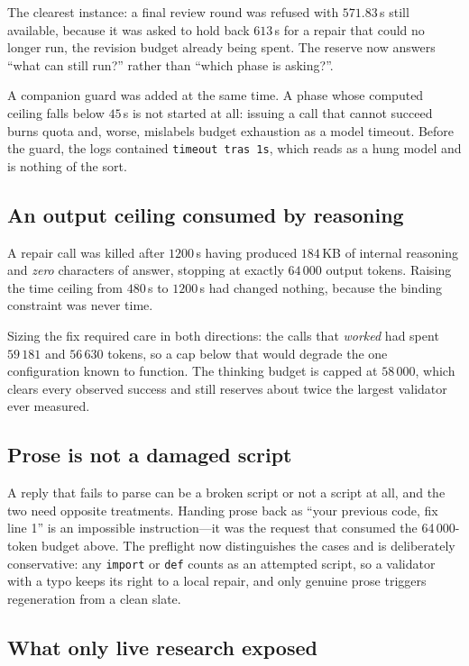 \documentclass[11pt,a4paper]{article}
\newcommand{\code}[1]{\texttt{\small #1}}
\begin{document}
The clearest instance: a final review round was refused with $571.83$\,s still
available, because it was asked to hold back $613$\,s for a repair that could no
longer run, the revision budget already being spent. The reserve now answers
``what can still run?'' rather than ``which phase is asking?''.

A companion guard was added at the same time. A phase whose computed ceiling
falls below $45$\,s is not started at all: issuing a call that cannot succeed
burns quota and, worse, mislabels budget exhaustion as a model timeout. Before
the guard, the logs contained \code{timeout tras 1s}, which reads as a hung
model and is nothing of the sort.

\subsection{An output ceiling consumed by reasoning}

A repair call was killed after $1200$\,s having produced $184$\,KB of internal
reasoning and \emph{zero} characters of answer, stopping at exactly $64\,000$
output tokens. Raising the time ceiling from $480$\,s to $1200$\,s had changed
nothing, because the binding constraint was never time.

Sizing the fix required care in both directions: the calls that \emph{worked}
had spent $59\,181$ and $56\,630$ tokens, so a cap below that would degrade the
one configuration known to function. The thinking budget is capped at $58\,000$,
which clears every observed success and still reserves about twice the largest
validator ever measured.

\subsection{Prose is not a damaged script}
\label{sec:notcode}

A reply that fails to parse can be a broken script or not a script at all, and
the two need opposite treatments. Handing prose back as ``your previous code,
fix line 1'' is an impossible instruction---it was the request that consumed the
64\,000-token budget above. The preflight now distinguishes the cases and is
deliberately conservative: any \code{import} or \code{def} counts as an
attempted script, so a validator with a typo keeps its right to a local repair,
and only genuine prose triggers regeneration from a clean slate.

\subsection{What only live research exposed}
\label{sec:live}
\end{document}
